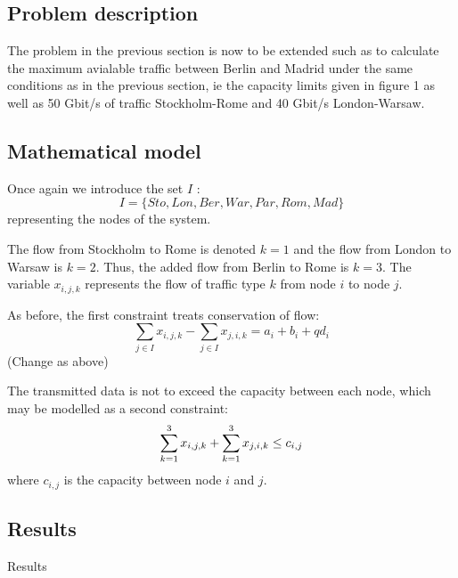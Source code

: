 \subsection{Problem description}

The problem in the previous section is now to be extended such as to calculate the maximum  avialable traffic between Berlin and Madrid under the same conditions as in the previous section, ie the capacity limits given in figure 1 as well as 50 Gbit/s of traffic Stockholm-Rome and 40 Gbit/s London-Warsaw. 

\subsection{Mathematical model}
Once again we introduce the set $I$ :
$$I = \{ Sto,Lon,Ber,War,Par,Rom,Mad\}$$
representing the nodes of the system.

The flow from Stockholm to Rome is denoted $k=1$ and the flow from London to Warsaw is $k=2$. Thus, the added flow from Berlin to Rome is $k=3$. The variable $x_{i,j,k}$ represents the flow of traffic type $k$ from node $i$ to node $j$.

As before, the first constraint treats conservation of flow:
$$\sum\limits_{j \in I} x_{i,j,k} - \sum\limits_{j \in I} x_{j,i,k} = a_{i} + b_{i} + q d_{i}$$
(Change as above)

The transmitted data is not to exceed the capacity between each node, which may be modelled as a second constraint:
$$\sum\limits_{k =1}^3 x_{i,j,k} + \sum\limits_{k =1}^3 x_{j,i,k} \leq c_{i,j}\\$$
where $c_{i,j}$ is the capacity between node $i$ and $j$.



\subsection{Results}
Results
